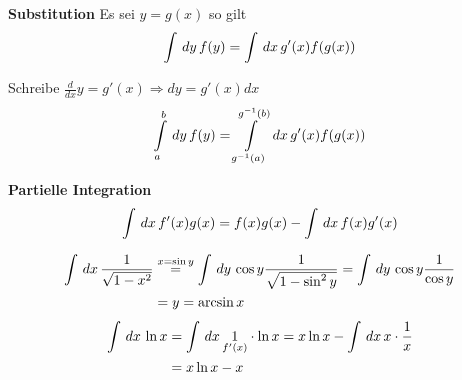 \par{\bf Substitution}
Es sei $y = g(x)$ so gilt
\begin{equation}
\int \,dy\, f(y) = \int \,dx\, g'(x)f(g(x))
\end{equation}

\begin{Bemerkung}
Schreibe $\frac{d}{dx}y = g'(x) \Rightarrow dy = g'(x)dx$
\begin{equation*}
\int \limits_{a}^{b} \,dy\, f(y) = \int \limits_{g^{-1}(a)}^{g^{-1}(b)} \,dx\,
g'(x)f(g(x))
\end{equation*}
\end{Bemerkung}

\par{\bf Partielle Integration}
\begin{equation}
\int \,dx\, f'(x)g(x) = f(x)g(x) - \int \,dx\, f(x)g'(x)
\end{equation}

\begin{Beispiel}
\begin{align*}
\int \,dx\, \frac{1}{\sqrt{1-x^2}} &\stackrel{x = \sin{y}}= \int \,dy\, \cos{y}
\frac{1}{\sqrt{1-\sin^2{y}}} = \int \,dy\, \cos{y} \frac{1}{\cos{y}}\\
 &= y = \arcsin{x}
\end{align*}
\begin{align*}
\int \,dx\, \ln{x} &= \int \,dx\, \underset{f'(x)}{1} \cdot \ln{x} = x\ln{x} -
\int \,dx\, x \cdot \frac{1}{x} \\
&= x\ln{x} - x
\end{align*}
\end{Beispiel}